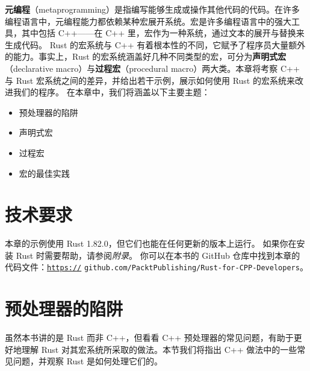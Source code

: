 \label{idx:idx_c5022777}
\textbf{元编程}（metaprogramming）是指编写能够生成或操作其他代码的代码。在许多编程语言中，元编程能力都依赖某种宏展开系统。宏是许多编程语言中的强大工具，其中包括 C++——在 C++ 里，宏作为一种系统，通过文本的展开与替换来生成代码。
\label{idx:idx_f83e6cf8}
\label{idx:idx_37fe4465}
Rust 的宏系统与 C++ 有着根本性的不同，它赋予了程序员大量额外的能力。事实上，Rust 的宏系统涵盖好几种不同类型的宏，可分为\textbf{声明式宏}（declarative macro）与\textbf{过程宏}（procedural macro）两大类。本章将考察 C++ 与 Rust 宏系统之间的差异，并给出若干示例，展示如何使用 Rust 的宏系统来改进我们的程序。
在本章中，我们将涵盖以下主要主题：
\begin{itemize}
  \item 预处理器的陷阱
  \item 声明式宏
  \item 过程宏
  \item 宏的最佳实践
\end{itemize}
\section{技术要求}
本章的示例使用 Rust 1.\allowbreak{}82.\allowbreak{}0，但它们也能在任何更新的版本上运行。
如果你在安装 Rust 时需要帮助，请参阅\emph{附录}。
你可以在本书的 GitHub 仓库中找到本章的代码文件：\href{https://}{\texttt{https://}}
\texttt{github.\allowbreak{}com/\allowbreak{}PacktPublishing/\allowbreak{}Rust-\allowbreak{}for-\allowbreak{}CPP-\allowbreak{}Developers}。
\section{预处理器的陷阱}
\label{idx:idx_def9a534}
虽然本书讲的是 Rust 而非 C++，但看看 C++ 预处理器的常见问题，有助于更好地理解 Rust 对其宏系统所采取的做法。本节我们将指出 C++ 做法中的一些常见问题，并观察 Rust 是如何处理它们的。
